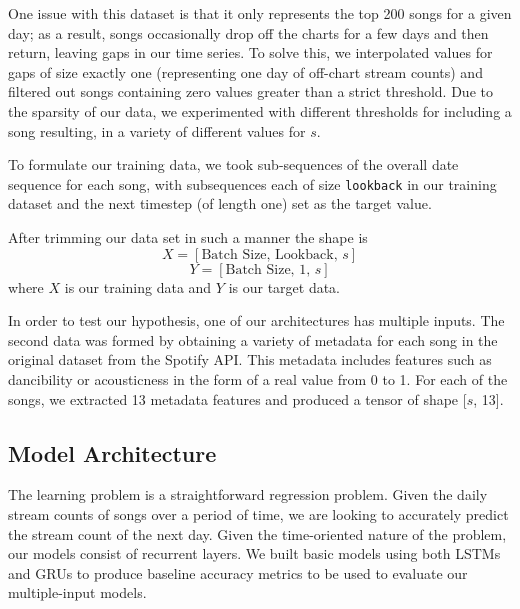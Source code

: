 \documentclass[11pt]{article}
\begin{document}
One issue with this dataset is that it only represents the top 200 songs for a given day; as a result, songs occasionally drop off the charts for a few days and then return, leaving gaps in our time series. To solve this, we interpolated values for gaps of size exactly one (representing one day of off-chart stream counts) and filtered out songs containing zero values greater than a strict threshold. Due to the sparsity of our data, we experimented with different thresholds for including a song resulting, in a variety of different values for $s$.


To formulate our training data, we took sub-sequences of the overall date sequence for each song, with subsequences each of size \texttt{lookback} in our training dataset and the next timestep (of length one) set as the target value.

 After trimming our data set in such a manner the shape is 
\[X = [\text{Batch Size, Lookback, $s$}]\]
\[Y = [\text{Batch Size, 1, $s$}]\]
where $X$ is our training data and $Y$ is our target data.

In order to test our hypothesis, one of our architectures has multiple inputs. The second data was formed by obtaining a variety of metadata for each song in the original dataset from the Spotify API. This metadata includes features such as dancibility or acousticness in the form of a real value from 0 to 1. For each of the songs, we extracted 13 metadata features and produced a tensor of shape [$s$, 13].

\subsection{Model Architecture}

The learning problem is a straightforward regression problem. Given the daily stream counts of songs over a period of time, we are looking to accurately predict the stream count of the next day. Given the time-oriented nature of the problem, our models consist of recurrent layers. We built basic models using both LSTMs and GRUs to produce baseline accuracy metrics to be used to evaluate our multiple-input models. 
\end{document}
